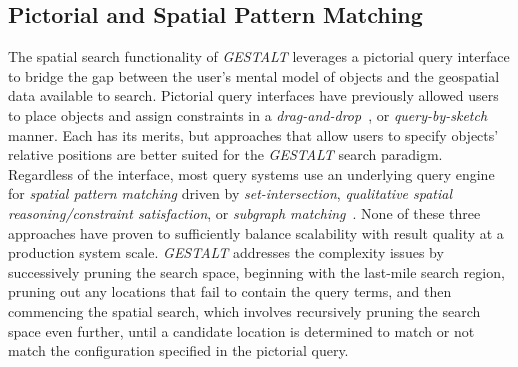 \subsection{Pictorial and Spatial Pattern Matching}
\par{The spatial search functionality of \emph{GESTALT} leverages a pictorial query interface to bridge the gap between the user's mental model of objects and the geospatial data available to search. 
Pictorial query interfaces have previously allowed users to place objects and assign constraints in a \textit{drag-and-drop}~\cite{DiLoreto1996, Soffer1997, Soffer1998a, Folkers2000}, or \textit{query-by-sketch}~\cite{Schwering2014} manner. Each has its merits, but approaches that allow users to specify objects' relative positions are better suited for the \emph{GESTALT} search paradigm. 
Regardless of the interface, most query systems use an underlying query engine for \textit{spatial pattern matching} driven by \textit{set-intersection}, \textit{qualitative spatial reasoning/constraint satisfaction}, or \textit{subgraph matching}~\cite{Osul2023}.
None of these three approaches have proven to sufficiently balance scalability with result quality at a production system scale. 
\textit{GESTALT} addresses the complexity issues by successively pruning the search space, beginning with the last-mile search region, pruning out any locations that fail to contain the query terms, and then commencing the spatial search, which involves recursively pruning the search space even further, until a candidate location is determined to match or not match the configuration specified in the pictorial query.}



